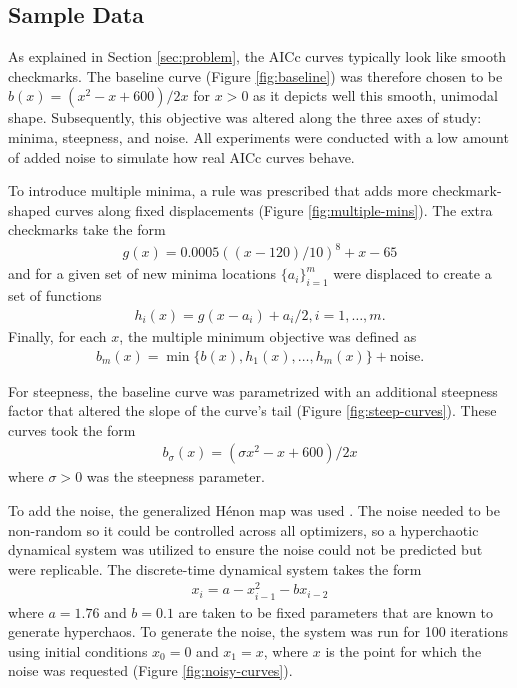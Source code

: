 \documentclass[letterpaper,12pt,twocolumn]{article}
\begin{document}
\subsection{Sample Data}
As explained in Section \ref{sec:problem}, the AICc curves typically look like smooth checkmarks. The baseline curve (Figure \ref{fig:baseline}) was therefore chosen to be $b(x) = (x^2 - x + 600)/2x$ for $x > 0$ as it depicts well this smooth, unimodal shape. Subsequently, this objective was altered along the three axes of study: minima, steepness, and noise. All experiments were conducted with a low amount of added noise to simulate how real AICc curves behave.

To introduce multiple minima, a rule was prescribed that adds more checkmark-shaped curves along fixed displacements (Figure \ref{fig:multiple-mins}). The extra checkmarks take the form \begin{align*}
    g(x) = 0.0005((x-120)/10)^8 + x - 65
\end{align*} and for a given set of new minima locations $\{a_i\}_{i=1}^m$ were displaced to create a set of functions \begin{align*}
    h_i(x) = g(x - a_i) + a_i/2, i = 1, \dots, m.
\end{align*} Finally, for each $x$, the multiple minimum objective was defined as \begin{align*}
    b_m(x) = \min \{b(x), h_1(x), \dots, h_m(x)\} + \text{noise}.
\end{align*} 

For steepness, the baseline curve was parametrized with an additional steepness factor that altered the slope of the curve's tail (Figure \ref{fig:steep-curves}). These curves took the form \begin{align*}
    b_\sigma(x) = (\sigma x^2 - x + 600)/2x
\end{align*} where $\sigma > 0$ was the steepness parameter.

To add the noise, the generalized Hénon map was used \cite{Henon1976}. The noise needed to be non-random so it could be controlled across all optimizers, so a hyperchaotic dynamical system was utilized to ensure the noise could not be predicted but were replicable. The discrete-time dynamical system takes the form \begin{align*}
    x_i = a - x_{i-1}^2 - bx_{i-2}
\end{align*} where $a = 1.76$ and $b = 0.1$ are taken to be fixed parameters that are known to generate hyperchaos. To generate the noise, the system was run for 100 iterations using initial conditions $x_0 = 0$ and $x_1 = x$, where $x$ is the point for which the noise was requested (Figure \ref{fig:noisy-curves}). 
\end{document}
